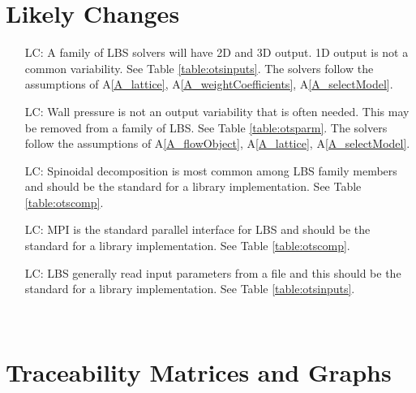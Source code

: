 \documentclass[12pt]{article}
\newcounter{lcnum} %
\begin{document}
\section{Likely Changes}    

\noindent \begin{itemize}

\item[LC\refstepcounter{lcnum}\thelcnum\label{LC_output}:] 
A family of LBS solvers will have 2D and 3D output. 1D output is not a common variability. See Table \ref{table:otsinputs}. The solvers follow the assumptions of A\ref{A_lattice}, A\ref{A_weightCoefficients}, A\ref{A_selectModel}.
\item[LC\refstepcounter{lcnum}\thelcnum\label{LC_wallpressure}:] 
Wall pressure is not an output variability that is often needed. This may be removed from a family of LBS. See Table \ref{table:otsparm}. The solvers follow the assumptions of A\ref{A_flowObject}, A\ref{A_lattice}, A\ref{A_selectModel}.
\item[LC\refstepcounter{lcnum}\thelcnum\label{LC_decomposiiton}:] 
Spinoidal decomposition is most common among LBS family members and should be the standard for a library implementation. See Table \ref{table:otscomp}.
\item[LC\refstepcounter{lcnum}\thelcnum\label{LC_parallel}:] 
MPI is the standard parallel interface for LBS and should be the standard for a library implementation. See Table \ref{table:otscomp}.
\item[LC\refstepcounter{lcnum}\thelcnum\label{LC_input}:] 
LBS generally read input parameters from a file and this should be the standard for a library implementation. See Table \ref{table:otsinputs}.

\end{itemize}

~\newpage

\section{Traceability Matrices and Graphs}
\end{document}
